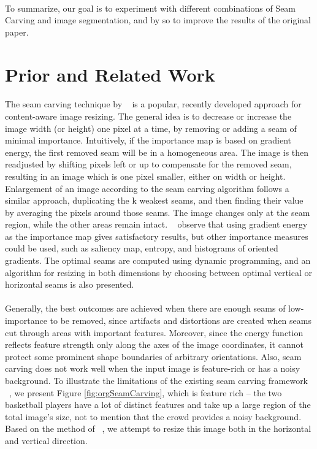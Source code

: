 \documentclass[conference]{acmsiggraph}
\begin{document}
\paragraph{}
To summarize, our goal is to experiment with different combinations of Seam Carving and image segmentation, and by so to improve the results of the original paper.


\section{Prior and Related Work}

\paragraph{}
The seam carving technique by ~\cite{Avidan2007} is a popular, recently developed approach for content-aware image resizing. The general idea is to decrease or increase the image width (or height) one pixel at a time,  by removing or adding a seam of minimal importance. Intuitively, if the importance map is based on gradient energy, the first removed seam will be in a homogeneous area. The image is then readjusted by shifting pixels left or up to compensate for the removed seam, resulting in an image which is one pixel smaller, either on width or height. Enlargement of an image according to the seam carving algorithm follows a similar approach, duplicating the k weakest seams, and then finding their value by averaging the pixels around those seams. The image changes only at the seam region, while the other areas remain intact. ~\cite{Avidan2007} observe that using gradient energy as the importance map gives satisfactory results, but other importance measures could be used, such as saliency map, entropy, and histograms of oriented gradients. The optimal seams are computed using dynamic programming, and an algorithm for resizing in both dimensions by choosing between optimal vertical or horizontal seams is also presented. 

\paragraph{}
Generally, the best outcomes are achieved when there are enough seams of low-importance to be removed, since artifacts and distortions are created when seams cut through areas with important features. Moreover, since the energy function reflects feature strength only along the axes  of the image coordinates, it cannot protect some prominent shape boundaries of arbitrary orientations. Also, seam carving does not work well when the input image is feature-rich or has a noisy background. To illustrate the limitations of the existing seam carving framework ~\cite{Avidan2007}, we present Figure \ref{fig:orgSeamCarving}, which is feature rich -- the two basketball players have a lot of distinct features and take up a large region of the total image's size, not to mention that the crowd provides a noisy background. Based on the method of ~\cite{Avidan2007}, we attempt to resize this image both in the horizontal and vertical direction.
\end{document}
